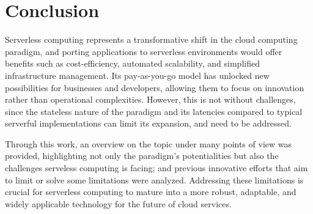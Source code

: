\documentclass[
	a4paper, %
	12pt,
	twoside, %
]{LTJournalArticle}
\begin{document}
\section{Conclusion}
Serverless computing represents a transformative shift in the cloud computing paradigm, and porting applications to serverless environments would offer benefits such as cost-efficiency, automated scalability, and simplified infrastructure management. Its pay-as-you-go model has unlocked new possibilities for businesses and developers, allowing them to focus on innovation rather than operational complexities. However, this is not without challenges, since the stateless nature of the paradigm and its latencies compared to typical serverful implementations can limit its expansion, and need to be addressed. 

Through this work, an overview on the topic under many points of view was provided, highlighting not only the paradigm's potentialities but also the challenges serveless computing is facing; and previous innovative efforts that aim to limit or solve some limitations were analyzed. Addressing these limitations is crucial for serverless computing to mature into a more robust, adaptable, and widely applicable technology for the future of cloud services.




\end{document}

